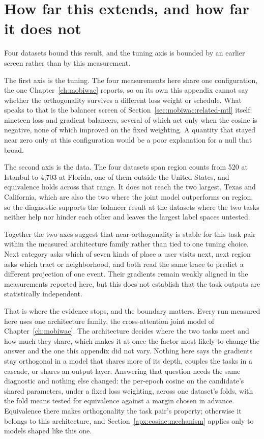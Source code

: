 \section{How far this extends, and how far it does not}
\label{apx:cosine:extension}

Four datasets bound this result, and the tuning axis is bounded by an earlier screen rather than by
this measurement.

The first axis is the tuning. The four measurements here share one configuration, the one
Chapter~\ref{ch:mobiwac} reports, so on its own this appendix cannot say whether the orthogonality
survives a different loss weight or schedule. What speaks to that is the balancer screen of
Section~\ref{sec:mobiwac:related-mtl} itself: nineteen loss and gradient balancers, several of
which act only when the cosine is negative, none of which improved on the fixed weighting. A
quantity that stayed near zero only at this configuration would be a poor explanation for a null
that broad.

\medskip\noindent
The second axis is the data. The four datasets span region counts from 520 at Istanbul to 4,703 at
Florida, one of them outside the United States, and equivalence holds across that range. It does not
reach the two largest, Texas and California, which are also the two where the joint model outperforms
on region, so the diagnostic supports the balancer result at the datasets where the two tasks neither
help nor hinder each other and leaves the largest label spaces untested.

Together the two axes suggest that near-orthogonality is stable for this task pair within the
measured architecture family rather than tied to one tuning choice. Next
category asks which of seven kinds of place a user visits next, next region asks which tract or
neighborhood, and both read the same trace to predict a different projection of one event. Their
gradients remain weakly aligned in the measurements reported here, but this does not establish that
the task outputs are statistically independent.

That is where the evidence stops, and the boundary matters. Every run measured here uses one
architecture family, the cross-attention joint model of Chapter~\ref{ch:mobiwac}. The architecture
decides where the two tasks meet and how much they share, which makes it at once the factor most
likely to change the answer and the one this appendix did not vary. Nothing here says the gradients
stay orthogonal in a model that shares more of its depth, couples the tasks in a cascade, or shares
an output layer.
Answering that question needs the same diagnostic and nothing else changed: the per-epoch
cosine on the candidate's shared parameters, under a fixed loss weighting, across one dataset's
folds, with the fold means tested for equivalence against a margin chosen in advance. Equivalence
there makes orthogonality the task pair's property; otherwise it belongs to this architecture, and
Section~\ref{apx:cosine:mechanism} applies only to models shaped like this one.
